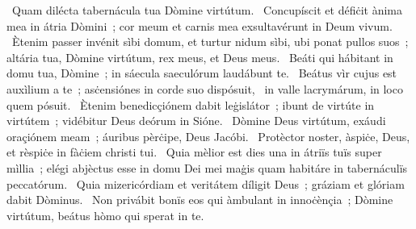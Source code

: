 \psalmChapterWithInscription{}
{ }
{%
~Quam dilécta tabernácula tua Dòmine virtútum. 
~Concupíscit et défiċit ànima mea in átria Dòmini~; cor meum et carnis mea exsultavérunt in Deum vivum. 
~Ètenim passer invénit sìbi domum, et turtur nidum sìbi, ubi ponat pullos suos~; altária tua, Dòmine virtútum, rex meus, et Deus meus. 
~Beáti qui hábitant in domu tua, Dòmine~; in sáecula saeculórum laudábunt te. 
~Beátus vìr cujus est auxìlium a te~; asċensiónes in corde suo dispósuit, 
~in valle lacrymárum, in loco quem pósuit. 
~Ètenim benedicçiónem dabit leġislátor~; ibunt de virtúte in virtútem~; vidébitur Deus deórum in Sióne. 
~Dòmine Deus virtútum, exáudi oraçiónem meam~; áuribus pèrċipe, Deus Jacóbi. 
~Protèctor noster, àspiċe, Deus, et rèspiċe in fàċiem christi tui. 
~Quia mèlior est dies una in átriïs tuïs super mìllia~; elégi abjèctus esse in domu Dei mei maġis quam habitáre in tabernáculïs peccatórum. 
~Quia mizericórdiam et veritátem díligit Deus~; gráziam et glóriam dabit Dòminus. 
~Non privábit bonïs eos qui àmbulant in innoċènçia~; Dòmine virtútum, beátus hòmo qui sperat in te. 
}
